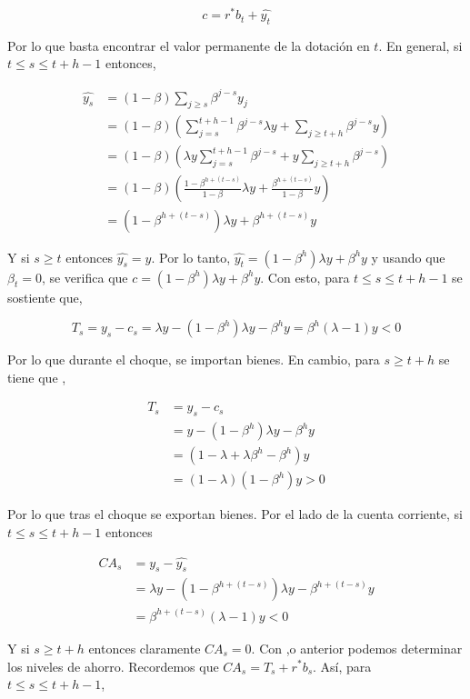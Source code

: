 \documentclass[]{article}
\begin{document}
\[
c = r^*b_t + \hat{y_t}
\]

Por lo que basta encontrar el valor permanente de la dotación en \(t\).
En general, si \(t \leq s \leq t+h-1\) entonces,

\[
\begin{align*}
\hat{y_s} &= (1-\beta)\sum_{j \geq s} \beta^{j-s}y_j \\
&= (1-\beta)\left(\sum_{j = s}^{t+h-1}\beta^{j-s}\lambda y + \sum_{j \geq t+h} \beta^{j-s} y\right) \\
& = (1-\beta)\left(\lambda y \sum_{j = s}^{t+h-1}\beta^{j-s} + y \sum_{j \geq t+h} \beta^{j-s }  \right) \\
& = (1-\beta)\left(\frac{1-\beta^{h+(t-s)}}{1-\beta}\lambda y + \frac{\beta^{h+(t-s)}}{1-\beta}y\right) \\
& = \left(1-\beta^{h+(t-s)}\right)\lambda y + \beta^{h+(t-s)} y
\end{align*}
\]

Y si \(s \geq t\) entonces \(\hat{y_s} = y\). Por lo tanto,
\(\hat{y_t} = (1-\beta^h)\lambda y + \beta^h y\) y usando que
\(\beta_t = 0\), se verifica que
\(c = (1-\beta^h)\lambda y + \beta^h y\). Con esto, para
\(t \leq s \leq t+h-1\) se sostiente que,

\[
T_s = y_s - c_s = \lambda y - (1-\beta^h)\lambda y - \beta^h y = \beta^h(\lambda - 1)y < 0
\]

Por lo que durante el choque, se importan bienes. En cambio, para
\(s \geq t+h\) se tiene que ,

\[
\begin{align*}
T_s &= y_s - c_s \\
& = y -(1-\beta^h)\lambda y - \beta^h y \\
& =  (1 - \lambda + \lambda \beta^h  - \beta^h)y \\
& = (1-\lambda)(1-\beta^h)y > 0
\end{align*}
\]

Por lo que tras el choque se exportan bienes. Por el lado de la cuenta
corriente, si \(t \leq s \leq t+h-1\) entonces

\[
\begin{align*}
CA_s & = y_s - \hat{y_s} \\
& = \lambda y - \left(1-\beta^{h+(t-s)}\right)\lambda y - \beta^{h+(t-s)} y \\
& = \beta^{h +(t-s)}(\lambda-1)y < 0 
\end{align*}
\]

Y si \(s \geq t+h\) entonces claramente \(CA_s = 0\). Con ,o anterior
podemos determinar los niveles de ahorro. Recordemos que
\(CA_s = T_s + r^*b_s\). Así, para \(t \leq s \leq t+h-1\),
\end{document}

